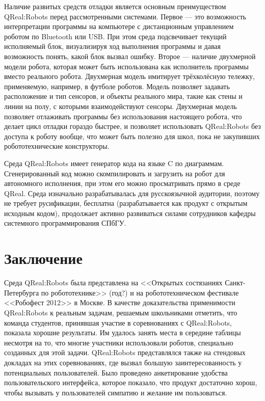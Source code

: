 \documentclass[a4paper]{article}
\begin{document}
Наличие развитых средств отладки является основным преимуществом QReal:Robots перед рассмотренными системами. Первое --- это возможность интерпретации программы на компьютере с дистанционным управлением роботом по Bluetooth или USB. При этом среда подсвечивает текущий исполняемый блок, визуализируя ход выполнения программы и давая возможность понять, какой блок вызвал ошибку. Второе --- наличие двухмерной модели робота, которая может быть использована как исполнитель программы вместо реального робота. Двухмерная модель имитирует трёхколёсную тележку, применяемую, например, в футболе роботов. Модель позволяет задавать расположение и тип сенсоров, и объекты реального мира, такие как стены и линии на полу, с которыми взаимодействуют сенсоры. Двухмерная модель позволяет отлаживать программы без использования настоящего робота, что делает цикл отладки гораздо быстрее, и позволяет использовать QReal:Robots без доступа к роботу вообще, что может быть полезно для школ, пока не закупивших робототехнические конструкторы.

Среда QReal:Robots имеет генератор кода на языке C по диаграммам. Сгенерированный код можно скомпилировать и загрузить на робот для автономного исполнения, при этом его можно просматривать прямо в среде QReal. Среда изначально разрабатывалась для русскоязычной аудитории, поэтому не требует русификации, бесплатна (разрабатывается как продукт с открытым исходным кодом), продолжает активно развиваться силами сотрудников кафедры системного программирования СПбГУ.

\section*{Заключение}

Среда QReal:Robots была представлена на <<Открытых состязаниях Санкт-Петербурга по робототехнике>> (год?) и на робототехническом фестивале <<Робофест 2012>> в Москве. В качестве доказательства применимости QReal:Robots к реальным задачам, решаемым школьниками отметить, что команда студентов, принявшая  участие в соревнованиях с QReal:Robots, показала хорошие результаты. Им удалось занять места в середине таблицы несмотря на то, что многие участники использовали роботов, специально созданных для этой задачи. QReal:Robots представлялся также на стендовых докладах на этих соревнованиях, где вызвал большую заинтересованность у потенциальных пользователей. Было проведено анкетирование удобства пользовательского интерфейса, которое показало, что продукт достаточно хорош, чтобы вызывать у пользователей симпатию и желание им пользоваться.
\end{document}
